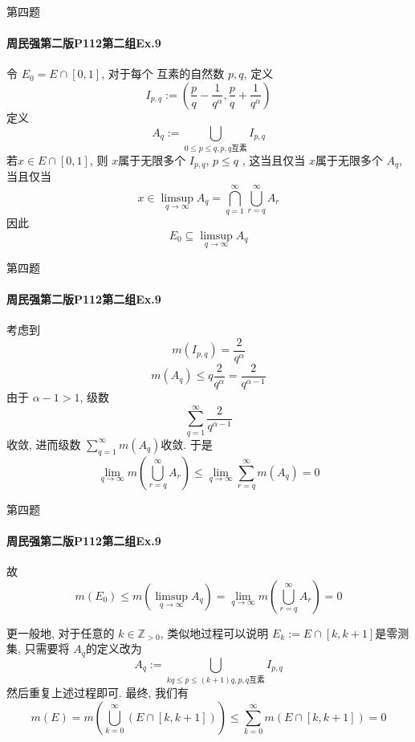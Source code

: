 \documentclass{beamer}
\begin{document}
\begin{frame}[fragile]{第四题}
\framesubtitle{周民强第二版P112第二组Ex.9 }

    令 \(  E_0= E\cap \left[ 0,1 \right]   \), 对于每个 互素的自然数 \(  p,q  \), 定义 \[
    I_{p,q}:= \left( \frac{p }{q }-\frac{1 }{q^{\alpha } }, \frac{p }{q }+ \frac{1 }{q^{\alpha } }     \right) 
    \]  定义 \[
    A_{q}:= \bigcup _{0\le p\le q, p,q\text{互素}  }I_{p,q}
    \]  若\(  x\in E  \cap \left[ 0,1 \right] \), 则 \(  x  \)属于无限多个 \(  I_{p,q}  \), \(  p\le q  \) , 这当且仅当 \(  x  \)属于无限多个 \(  A_{q}  \), 当且仅当 \[
    x \in \limsup_{q\to \infty}A_{q}= \bigcap _{q = 1}^{\infty}\bigcup _{r= q}^{\infty}A_{r}
    \]   因此 \[
    E_0\subseteq \limsup_{q\to \infty}A_{q}
    \]
\end{frame}


\begin{frame}[fragile]{第四题}
\framesubtitle{周民强第二版P112第二组Ex.9 }
  考虑到 \[
    m\left( I_{p,q} \right)= \frac{2 }{q^{\alpha } }  
    \] \[
    m\left( A_{q} \right)\le q\frac{2 }{q^{\alpha } }= \frac{2 }{q^{\alpha -1} }   
    \] 由于 \(  \alpha -1> 1  \), 级数 \[
    \sum _{ q = 1}^{\infty}\frac{2 }{q^{\alpha -1} } 
    \]收敛, 进而级数 \(  \sum _{q = 1}^{\infty}m\left( A_{q} \right)   \)收敛.  于是 \[
    \lim_{q\to \infty}m\left( \bigcup _{r = q}^{\infty}A_{r} \right)\le \lim_{q\to \infty} \sum _{ r = q}^{\infty}m\left( A_{q} \right)  = 0
    \]
\end{frame}


\begin{frame}[fragile]{第四题}
\framesubtitle{周民强第二版P112第二组Ex.9 }
 故 \[
  m\left( E_0 \right)\le    m\left( \limsup_{q\to \infty}A_{q}\right)= \lim_{q\to \infty}m\left( \bigcup _{r=  q }^{\infty}A_{r} \right)=  0 
    \]

    更一般地, 对于任意的 \(  k \in \mathbb{Z}_{> 0} \), 类似地过程可以说明 \(  E_{k}:=  E\cap \left[ k,k+ 1 \right]   \)是零测集, 只需要将 \(  A_{q}  \)的定义改为 \[
    A_{q}:= \bigcup _{kq\le p\le \left( k+ 1 \right)q ,  p,q\text{互素}}I_{p,q}
    \]   然后重复上述过程即可. 最终, 我们有 \[
   m\left( E \right)= m\left( \bigcup _{k = 0}^{\infty}\left( E\cap \left[ k,k+ 1 \right]  \right)  \right)  \le \sum _{k = 0}^{\infty}m\left( E\cap \left[ k,k+ 1 \right]  \right)= 0 
    \]
\end{frame}
\end{document}
